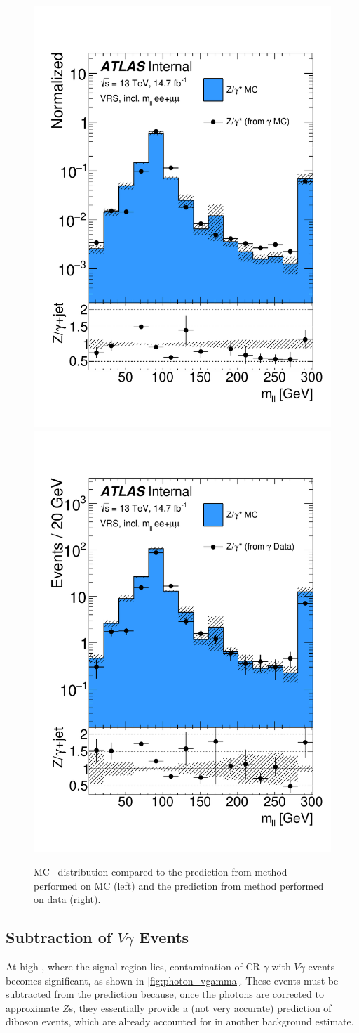 \begin{centering}
\begin{figure}[!hbt]
\myfloatalign
\includegraphics[width=.45\linewidth]{figures/photons/DataMC_GJ_ee+mm_zmet_GMC.pdf}
\includegraphics[width=.45\linewidth]{figures/photons/DataMC_GJ_ee+mm_zmet_ZMC.pdf}
\caption{\dyjets \ac{MC} \mll~distribution compared to the prediction from \gjets method performed on \ac{MC} (left) and the prediction from \gjets method performed on data (right).}
\label{fig:photon_mll_mc}
\end{figure}
\end{centering}

\subsection{Subtraction of $V\gamma$ Events}

At high \met, where the signal region lies, contamination of CR-$\gamma$ with $V\gamma$ events becomes significant, as shown in \autoref{fig:photon_vgamma}. These events must be subtracted from the \gjets prediction because, once the photons are corrected to approximate $Z$s, they essentially provide a (not very accurate) prediction of diboson events, which are already accounted for in another background estimate. 

